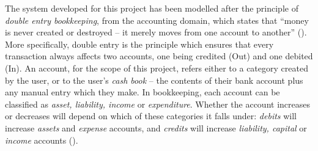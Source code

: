 The system developed for this project has been modelled after the principle of
\emph{double entry bookkeeping}, from the accounting domain, which states that
``money is never created or destroyed -- it merely moves from one account to
another'' (\cite[][Section 6.2]{fowler1997analysis}). More specifically, double
entry is the principle which ensures that every transaction always affects two
accounts, one being credited (Out) and one debited (In). An account, for the
scope of this project, refers either to a category created by the user, or to
the user's \emph{cash book} -- the contents of their bank account plus any
manual entry which they make. In bookkeeping, each account can be classified as
\emph{asset, liability, income} or \emph{expenditure}. Whether the account
increases or decreases will depend on which of these categories it falls under:
\emph{debits} will increase \emph{assets} and \emph{expense} accounts, and
\emph{credits} will increase \emph{liability, capital} or \emph{income}
accounts (\cite[][pp.~18-19]{wood2004book}).

